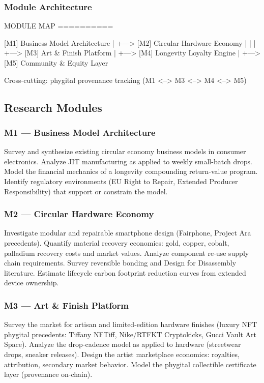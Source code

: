 \documentclass[11pt,letterpaper]{article}
\begin{document}
\subsubsection{Module Architecture}

\begin{asciibox}
MODULE MAP
==========

  [M1] Business Model Architecture
         |
         +---> [M2] Circular Hardware Economy
         |           |
         |           +---> [M3] Art & Finish Platform
         |
         +---> [M4] Longevity Loyalty Engine
                     |
                     +---> [M5] Community & Equity Layer

Cross-cutting: phygital provenance tracking (M1 <--> M3 <--> M4 <--> M5)
\end{asciibox}

\subsection{Research Modules}

\subsubsection{M1 --- Business Model Architecture}
Survey and synthesize existing circular economy business models in consumer electronics. Analyze JIT manufacturing as applied to weekly small-batch drops. Model the financial mechanics of a longevity compounding return-value program. Identify regulatory environments (EU Right to Repair, Extended Producer Responsibility) that support or constrain the model.

\subsubsection{M2 --- Circular Hardware Economy}
Investigate modular and repairable smartphone design (Fairphone, Project Ara precedents). Quantify material recovery economics: gold, copper, cobalt, palladium recovery costs and market values. Analyze component re-use supply chain requirements. Survey reversible bonding and Design for Disassembly literature. Estimate lifecycle carbon footprint reduction curves from extended device ownership.

\subsubsection{M3 --- Art \& Finish Platform}
Survey the market for artisan and limited-edition hardware finishes (luxury NFT phygital precedents: Tiffany NFTiff, Nike/RTFKT Cryptokicks, Gucci Vault Art Space). Analyze the drop-cadence model as applied to hardware (streetwear drops, sneaker releases). Design the artist marketplace economics: royalties, attribution, secondary market behavior. Model the phygital collectible certificate layer (provenance on-chain).
\end{document}
